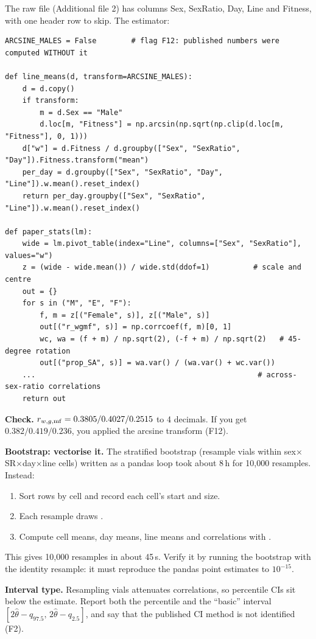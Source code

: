The raw file (Additional file 2) has columns Sex, SexRatio, Day, Line and Fitness, with one header row to skip. The estimator:
\begin{lstlisting}
ARCSINE_MALES = False        # flag F12: published numbers were computed WITHOUT it

def line_means(d, transform=ARCSINE_MALES):
    d = d.copy()
    if transform:
        m = d.Sex == "Male"
        d.loc[m, "Fitness"] = np.arcsin(np.sqrt(np.clip(d.loc[m, "Fitness"], 0, 1)))
    d["w"] = d.Fitness / d.groupby(["Sex", "SexRatio", "Day"]).Fitness.transform("mean")
    per_day = d.groupby(["Sex", "SexRatio", "Day", "Line"]).w.mean().reset_index()
    return per_day.groupby(["Sex", "SexRatio", "Line"]).w.mean().reset_index()

def paper_stats(lm):
    wide = lm.pivot_table(index="Line", columns=["Sex", "SexRatio"], values="w")
    z = (wide - wide.mean()) / wide.std(ddof=1)          # scale and centre
    out = {}
    for s in ("M", "E", "F"):
        f, m = z[("Female", s)], z[("Male", s)]
        out[("r_wgmf", s)] = np.corrcoef(f, m)[0, 1]
        wc, wa = (f + m) / np.sqrt(2), (-f + m) / np.sqrt(2)   # 45-degree rotation
        out[("prop_SA", s)] = wa.var() / (wa.var() + wc.var())
    ...                                                   # across-sex-ratio correlations
    return out
\end{lstlisting}
\textbf{Check.} $r_{w,g,\mathrm{mf}}=0.3805/0.4027/0.2515$ to 4 decimals. If you get $0.382/0.419/0.236$, you applied the arcsine transform (F12).

\textbf{Bootstrap: vectorise it.} The stratified bootstrap (resample vials within sex$\times$SR$\times$day$\times$line cells) written as a pandas loop took about 8\,h for 10,000 resamples. Instead:
\begin{enumerate}
\item Sort rows by cell and record each cell's start and size.
\item Each resample draws .
\item Compute cell means, day means, line means and correlations with .
\end{enumerate}
This gives 10,000 resamples in about 45\,s. Verify it by running the bootstrap with the identity resample: it must reproduce the pandas point estimates to $10^{-15}$.

\textbf{Interval type.} Resampling vials attenuates correlations, so percentile CIs sit below the estimate. Report both the percentile and the ``basic'' interval $[2\hat\theta-q_{97.5},\,2\hat\theta-q_{2.5}]$, and say that the published CI method is not identified (F2).

